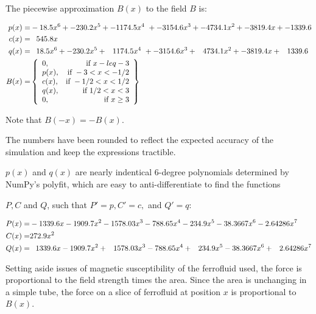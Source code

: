 \documentclass[]{asme2ej}
\begin{document}
The piecewise approximation $B(x)$ to the field $B$ is:

\begin{align}
  p(x) = & -18.5 x^6 + -230.2 x^5 + -1174.5  x^4\
  + -3154.6 x^3 + -4734.1 x^2 + -3819.4x + -1339.6 \\
  c(x) = & \hphantom{-}545.8 x \\
  q(x) = &  \hphantom{-}18.5 x^6 + -230.2 x^5 + \hphantom{-} 1174.5x^4 \
  + -3154.6x^3 +  \hphantom{-} 4734.1x^2 + -3819.4x + \hphantom{-} 1339.6 \\
B(x) = &
\left\{
    \begin{array}{lr}
      0 , & \text{if } x -leq -3 \\
      p(x) , & \text{if } -3 < x  < -1/2 \\
      c(x) , & \text{if } -1/2 < x < 1/2 \\
      q(x) , & \text{if } 1/2 < x < 3 \\
      0 , & \text{if } x \geq 3
    \end{array}
    \right\}
    \label{eq:Bfield}
\end{align}

Note that $B(-x) = -B(x)$.

The numbers have been rounded to reflect the expected accuracy of the
simulation and keep the expressions tractible.

$p(x)$ and $q(x)$ are nearly indentical 6-degree polynomials determined
by NumPy's polyfit, which are easy to anti-differentiate to find the functions

$P,C$ and $Q$, such that $P' = p, C' = c,$ and $Q' = q$:

\begin{align}
  P(x) = & -1339.6 x - 1909.7 x^2 - 1578.03 x^3 - 788.65 x^4 - 234.9 x^5 - 38.3667 x^6 - 2.64286 x^7 \\
  C(x) = & 272.9 x^2 \\
  Q(x) = &  \hphantom{-}1339.6 x - 1909.7 x^2 + \hphantom{-}1578.03 x^3 - 788.65 x^4 + \hphantom{-}234.9 x^5 - 38.3667 x^6 + \hphantom{-}2.64286 x^7 \\
\end{align}


Setting aside issues of magnetic susceptibility of the ferrofluid used,
the force is proportional
to the field strength times the area.
Since the area is unchanging in a simple tube, the force on
a slice of ferrofluid at position $x$ is proportional to $B(x)$.
\end{document}
